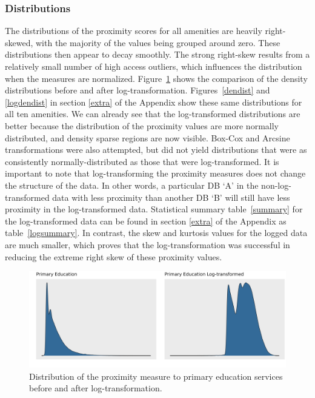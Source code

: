 \documentclass[11pt, a4paper]{article}
\begin{document}
\subsubsection{Distributions}

The distributions of the proximity scores for all amenities are heavily right-skewed, with the majority of the values being grouped around zero. These distributions then appear to decay smoothly. The strong right-skew results from a relatively small number of high access outliers, which influences the distribution when the measures are normalized. Figure~\ref{comparedist} shows the comparison of the density distributions before and after log-transformation. Figures~\ref{dendist} and \ref{logdendist} in section \ref{extra} of the Appendix show these same distributions for all ten amenities. We can already see that the log-transformed distributions are better because the distribution of the proximity values are more normally distributed, and density sparse regions are now visible. Box-Cox and Arcsine transformations were also attempted, but did not yield distributions that were as consistently normally-distributed as those that were log-transformed. It is important to note that log-transforming the proximity measures does not change the structure of the data. In other words, a particular DB `A' in the non-log-transformed data with less proximity than another DB `B' will still have less proximity in the log-transformed data. Statistical summary table~\ref{summary} for the log-transformed data can be found in section \ref{extra} of the Appendix as table~\ref{logsummary}. In contrast, the skew and kurtosis values for the logged data are much smaller, which proves that the log-transformation was successful in reducing the extreme right skew of these proximity values.




\begin{figure}[H]
\centering
\includegraphics[width=\textwidth]{./distributions/compare_distributions.png}
\caption[Comparison of distributions]{Distribution of the proximity measure to primary education services before and after log-transformation.}\label{comparedist}
\end{figure}
\end{document}
